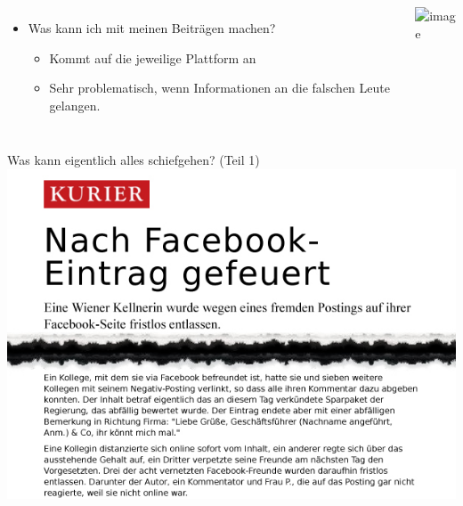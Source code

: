 \begin{frame}
	\begin{columns}[T]
	
	\column{150pt}	
	\begin{itemize}
		\item <1-> Was kann ich mit meinen Beiträgen machen?
		\begin{itemize}
			\item <2-> Kommt auf die jeweilige Plattform an
			\item <3-> Sehr problematisch, wenn Informationen an die falschen Leute gelangen.
		\end{itemize}
	\end{itemize}	
	\column{129pt}
	\includegraphics<4->[scale=0.5]{socialmedia-memes/scumbag_steve.jpg}
	\end{columns}
\end{frame}

\begin{frame}
	Was kann eigentlich alles schiefgehen? (Teil 1)\\
		\includegraphics[scale=0.5]{facebook-news/facebook-gefeuert.jpg}
\end{frame}


